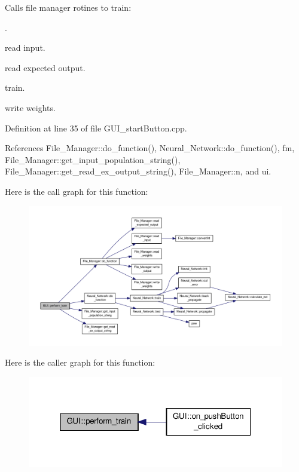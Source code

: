 Calls file manager rotines to train\-:\par
. 


\begin{DoxyEnumerate}
\item read input.\par

\item read expected output.\par

\item train.\par

\item write weights. 
\end{DoxyEnumerate}

Definition at line 35 of file G\-U\-I\-\_\-start\-Button.\-cpp.



References File\-\_\-\-Manager\-::do\-\_\-function(), Neural\-\_\-\-Network\-::do\-\_\-function(), fm, File\-\_\-\-Manager\-::get\-\_\-input\-\_\-population\-\_\-string(), File\-\_\-\-Manager\-::get\-\_\-read\-\_\-ex\-\_\-output\-\_\-string(), File\-\_\-\-Manager\-::n, and ui.



Here is the call graph for this function\-:
\nopagebreak
\begin{figure}[H]
\begin{center}
\leavevmode
\includegraphics[width=350pt]{d7/d46/a00002_ad1bb069dee02010a61045c91f5e7752f_cgraph}
\end{center}
\end{figure}




Here is the caller graph for this function\-:\nopagebreak
\begin{figure}[H]
\begin{center}
\leavevmode
\includegraphics[width=320pt]{d7/d46/a00002_ad1bb069dee02010a61045c91f5e7752f_icgraph}
\end{center}
\end{figure}


